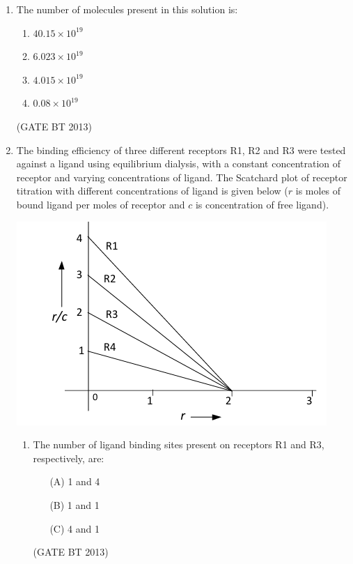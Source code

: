 \documentclass[journal,12pt,onecolumn]{IEEEtran}
\theoremstyle{remark}
\begin{document}
\begin{enumerate}
\item 

The number of molecules present in this solution is:

\begin{enumerate}
    \item \(40.15 \times 10^{19}\)
    \item \(6.023 \times 10^{19}\)
    \item \(4.015 \times 10^{19}\)
    \item \(0.08 \times 10^{19}\)
\end{enumerate} \hfill(GATE BT 2013)

\item 
The binding efficiency of three different receptors R1, R2 and R3 were tested against a ligand using 
equilibrium dialysis, with a constant concentration of receptor and varying concentrations of ligand. 
The Scatchard plot of receptor titration with different concentrations of ligand is given below 
(\(r\) is moles of bound ligand per moles of receptor and \(c\) is concentration of free ligand).

\begin{center}
\includegraphics[width=\columnwidth]{images/scatchard_plot.png}
\end{center}

\begin{enumerate}
    \item The number of ligand binding sites present on receptors R1 and R3, respectively, are:
    \begin{enumerate}
        \item[(A)] 1 and 4
        \item[(B)] 1 and 1
        \item[(C)] 4 and 1
    \end{enumerate} \hfill(GATE BT 2013)


\end{enumerate}
\end{enumerate}
\end{document}
